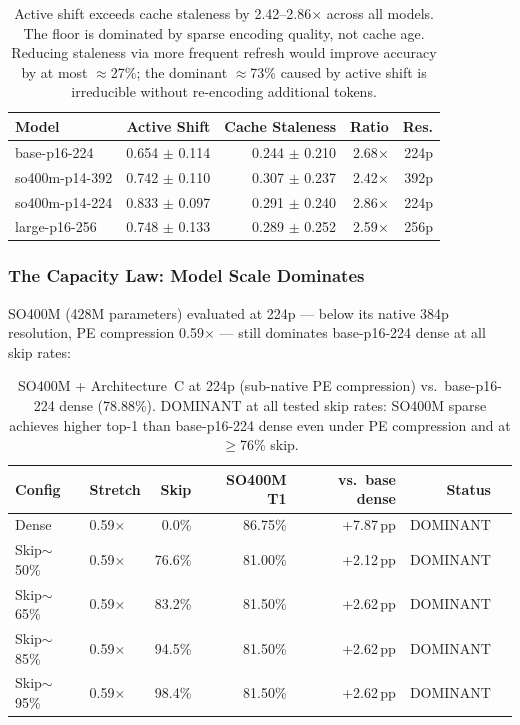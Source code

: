 \documentclass{article}
\begin{document}
\begin{table}[htbp]
\centering
\setlength{\tabcolsep}{4.5pt}
\renewcommand{\arraystretch}{1.12}
\begin{tabular}{lrrrr}
\toprule
\textbf{Model} & \textbf{Active Shift} & \textbf{Cache Staleness}
  & \textbf{Ratio} & \textbf{Res.} \\
\midrule
base-p16-224   & 0.654 $\pm$ 0.114 & 0.244 $\pm$ 0.210 & 2.68$\times$ & 224p \\
so400m-p14-392 & 0.742 $\pm$ 0.110 & 0.307 $\pm$ 0.237 & 2.42$\times$ & 392p \\
so400m-p14-224 & 0.833 $\pm$ 0.097 & 0.291 $\pm$ 0.240 & 2.86$\times$ & 224p \\
large-p16-256  & 0.748 $\pm$ 0.133 & 0.289 $\pm$ 0.252 & 2.59$\times$ & 256p \\
\bottomrule
\end{tabular}
\caption{Active shift exceeds cache staleness by 2.42--2.86$\times$ across
all models. The floor is dominated by sparse encoding quality, not cache
age. Reducing staleness via more frequent refresh would improve accuracy
by at most $\approx$27\%; the dominant $\approx$73\% caused by active
shift is irreducible without re-encoding additional tokens.}
\label{tab:contextual-incompatibility}
\end{table}

\subsubsection{The Capacity Law: Model Scale Dominates}
\label{sec:capacity-without-resolution}

SO400M (428M parameters) evaluated at 224p — below its native 384p
resolution, PE compression 0.59$\times$ — still dominates base-p16-224
dense at all skip rates:

\begin{table}[htbp]
\centering
\setlength{\tabcolsep}{4.5pt}
\renewcommand{\arraystretch}{1.12}
\begin{tabular}{llrrrrr}
\toprule
\textbf{Config} & \textbf{Stretch} & \textbf{Skip}
  & \textbf{SO400M T1} & \textbf{vs.\ base dense} & \textbf{Status} \\
\midrule
Dense    & 0.59$\times$ &  0.0\% & 86.75\% & +7.87\,pp & DOMINANT \\
Skip$\sim$50\% & 0.59$\times$ & 76.6\% & 81.00\% & +2.12\,pp & DOMINANT \\
Skip$\sim$65\% & 0.59$\times$ & 83.2\% & 81.50\% & +2.62\,pp & DOMINANT \\
Skip$\sim$85\% & 0.59$\times$ & 94.5\% & 81.50\% & +2.62\,pp & DOMINANT \\
Skip$\sim$95\% & 0.59$\times$ & 98.4\% & 81.50\% & +2.62\,pp & DOMINANT \\
\bottomrule
\end{tabular}
\caption{SO400M + Architecture~C at 224p (sub-native PE compression) vs.\
base-p16-224 dense (78.88\%). DOMINANT at all tested skip rates: SO400M
sparse achieves higher top-1 than base-p16-224 dense even under PE
compression and at $\geq$76\% skip.}
\label{tab:capacity-law}
\end{table}
\end{document}
